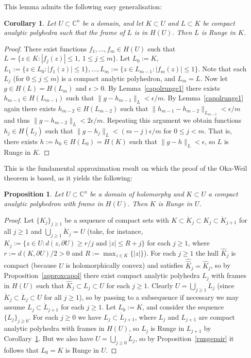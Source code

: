 \documentclass[11pt,a4paper, final, twoside]{article}
\newtheorem{corollary}[theorem]{Corollary}
\newtheorem{proposition}[theorem]{Proposition}
\numberwithin{equation}{section}
\newcommand{\C}{\mathbb C}
\newcommand{\bd}{\partial}
\newcommand{\inter}[1]{\mathring{#1}}
\newcommand{\emetric}{d}
\newcommand{\hol}{H}
\begin{document}
This lemma admits the following easy generalisation:
\begin{corollary}
\label{capolrunge}
Let $U\subset\C^n$ be a domain, and let $K\subset U$ and $L\subset K$ be compact analytic polyhedra such that the frame of $L$ is in $\hol(U)$.
Then $L$ is Runge in $K$.
\end{corollary}
\begin{proof}
There exist functions $f_1,\dots,f_m\in\hol(U)$ such that $L=\{z\in K\colon |f_j(z)|\leq 1,\,1\leq j\leq m\}$.
Let $L_0:=K$, $L_1:=\{z\in L_0\colon |f_1(z)|\leq 1\},\dots,L_m:=\{z\in L_{m-1}\colon |f_m(z)|\leq 1\}$. Note that each $L_j$ (for $0\leq j\leq m$) is a compact analytic polyhedron, and $L_m=L$.
Now let $g\in\hol(L)=\hol(L_m)$ and $\epsilon>0$. By Lemma~\ref{capolrunge1} there exists $h_{m-1}\in\hol(L_{m-1})$ such that $\|g-h_{m-1}\|_L<\epsilon/m$.
By Lemma~\ref{capolrunge1} again there exists $h_{m-2}\in\hol(L_{m-2})$ such that $\|h_{m-1}-h_{m-2}\|_{L_{m-1}}<\epsilon/m$ and thus $\|g-h_{m-2}\|_L<2\epsilon/m$. Repeating this argument
we obtain functions $h_j\in\hol(L_j)$ such that $\|g-h_j\|_L<(m-j)\epsilon/m$ for $0\leq j< m$. That is, there exists $h:=h_0\in\hol(L_0)=\hol(K)$ such
that $\|g-h\|_L<\epsilon$, so $L$ is Runge in $K$.
\end{proof}
This is the fundamental approximation result on which the proof of the Oka-Weil theorem is based, as it yields the following:
\begin{proposition}
\label{okaclose}
Let $U\subset\C^n$ be a domain of holomorphy and $K\subset U$ a compact analytic polyhedron with frame in $\hol(U)$. Then $K$ is Runge in $U$.
\end{proposition}
\begin{proof}
Let $\{K_j\}_{j\geq 1}$ be a sequence of compact sets with $K\subset \inter K_j\subset K_j\subset \inter K_{j+1}$ for all $j\geq 1$ and $\bigcup_{j\geq 1} \inter K_j=U$ (take, for instance,
$K_j:=\{z\in U\colon \emetric(z,\bd U)\geq r/j \text{ and } |z|\leq R+j\}$ for each $j\geq 1$, where $r:=\emetric(K,\bd U)/2>0$ and $R:=\max_{z\in K}\{|z|\}$). For each $j\geq 1$ the hull $\hat K_j$ is compact
(because $U$ is holomorphically convex) and satisfies $\hat {\hat K}_j=\hat K_j$, so by Proposition~\ref{approxcapol} there exist
compact analytic polyhedra $L_j$ with frames in $\hol(U)$ such that $\hat K_j\subset L_j\subset U$ for each $j\geq 1$. Clearly $U=\bigcup_{j\geq 1}\inter L_j$ (since $\inter K_j\subset \inter L_j\subset U$ for
all $j\geq 1$), so by passing
to a subsequence if necessary we may assume $L_j\subset \inter L_{j+1}$ for each $j\geq 1$. Let $L_0:=K$, and consider the sequence $\{L_j\}_{j\geq 0}$. For each
$j\geq 0$ we have $L_j\subset \inter L_{j+1}$, where $L_j$ and $L_{j+1}$ are compact analytic polyhedra with frames in $\hol(U)$, so 
$L_j$ is Runge in $L_{j+1}$ by Corollary~\ref{capolrunge}. But we also have $U=\bigcup_{j\geq 0} \inter L_j$, so by Proposition~\ref{rungepair} it follows that
$L_0=K$ is Runge in $U$.
\end{proof}
\end{document}
